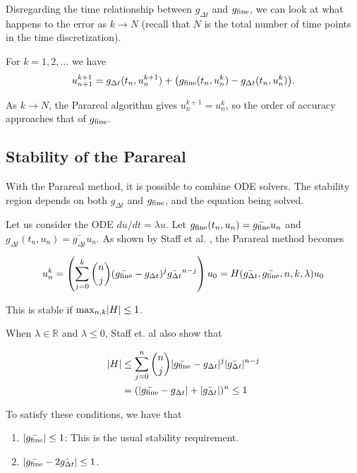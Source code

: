\documentclass[letterpaper,12pt]{article}
\begin{document}
Disregarding the time relationship between $g_{\Delta t}$ and
$g_{\textnormal{fine}}$, we can look at what happens to the error as $k \to N$
(recall that $N$ is the total number of time points in the time discretization). 

For $k = 1, 2, \ldots$ we have 
\[u_{n+1}^{k+1} = g_{\Delta t} (t_n, u_n^{k+1}) + \big(
g_{\textnormal{fine}}(t_n, u_n^k) - g_{\Delta t}(t_n, u_n^k)\big). \]

As $k \to N$, the Parareal algorithm gives $u_{n}^{k+1} = u^k_n$, so the order
of accuracy approaches that of $g_{\textnormal{fine}}$. 

\subsection{Stability of the Parareal}

With the Parareal method, it is possible to combine ODE solvers. The stability region depends on both $g_{\Delta t}$ and $g_{\textnormal{fine}}$, and the
equation being solved. 

Let us consider the ODE $du/dt = \lambda u$. Let $g_{\textnormal{fine}}(t_n,
u_n) = \bar{g_{\textnormal{fine}}}u_n$ and $g_{\Delta t}(t_n, u_n) =
\bar{g_{\Delta t}} u_n$. As shown by Staff et al. \cite{staff2005stability}, the Parareal method becomes 

\[ u_n^k = \left( \sum_{j=0}^k {n \choose j} (\bar{g_{\textnormal{fine}}} -
g_{\Delta t})^j \bar{g_{\Delta t}}^{n-j} \right) u_0 = H(\bar{g_{\Delta
t}}, \bar{g_{\textnormal{fine}}}, n, k, \lambda)u_0 \]

This is stable if $\textnormal{max}_{n, k} |H| \leq 1$. 

When $\lambda \in \mathbb{R}$ and $\lambda \leq 0$, Staff et. al also show that

\[
    \begin{aligned}
    |H| &\leq \sum_{j=0}^n {n \choose j} |\bar{g_{\textnormal{fine}}} -
    g_{\Delta t}|^j |\bar{g_{\Delta t}}|^{n-j} \\
    &= (|\bar{g_{\textnormal{fine}}} - g_{\Delta t}| + |\bar{g_{\Delta
    t}}|)^n \leq 1
    \end{aligned}
\]

To satisfy these conditions, we have that 
\begin{enumerate}
    \item $| \bar{g_{\textnormal{fine}}} | \leq 1$: This is the usual stability
        requirement.
    \item $|\bar{g_{\textnormal{fine}}} - 2 \bar{g_{\Delta t}}| \leq 1$.
\end{enumerate}
\end{document}
